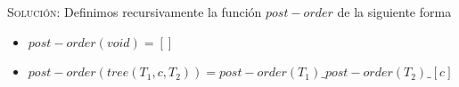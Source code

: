 \documentclass[letterpaper,11pt]{article}
\begin{document}
\begin{enumerate}
\begin{itemize}
        \textsc{Solución:} Definimos recursivamente la función $post-order$ de
        la siguiente forma 
        \begin{itemize}
            \item $post-order(void) = []$
            \item $post-order(tree(T_{1}, c, T_{2})) = 
            post-order(T_{1})\_post-order(T_{2})\_[c]$
        \end{itemize}
    \end{itemize}
\end{enumerate}
\end{document}
